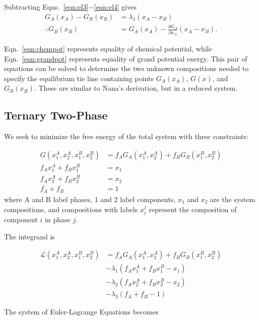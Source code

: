 \documentclass[10pt]{article}
\begin{document}
Subtracting Eqns.~\ref{eqn:el3}$-$\ref{eqn:el4} gives
\begin{align}
  G_A(x_A) - G_B(x_B) &= \lambda_1(x_A - x_B)\\
  \label{eqn:grandpot}
  \therefore G_B(x_B) &= G_A(x_A) - \frac{\partial G_A}{\partial x_A}\left(x_A - x_B\right).
\end{align}

Eqn.~\ref{eqn:chempot} represents equality of chemical potential, while
Eqn.~\ref{eqn:grandpot} represents equality of grand potential energy. This pair
of equations can be solved to determine the two unknown compositions needed to
specify the equilibrium tie line containing points $G_A(x_A)$, $G(x)$, and
$G_B(x_B)$. These are similar to Nana's derivation, but in a reduced system.

\subsection*{Ternary Two-Phase}

We seek to minimize the free energy of the total system with three constraints:

\begin{align}
  G(x_1^A, x_2^A, x_1^B, x_2^B) &= f_A G_A(x_1^A,x_2^A) + f_B G_B(x_1^B, x_2^B)\\
  f_A x_1^A + f_B x_1^B &= x_1\\
  f_A x_2^A + f_B x_2^B &= x_2\\
  f_A + f_B &= 1
\end{align}
where A and B label phases, 1 and 2 label components, $x_1$ and $x_2$ are the system compositions,
and compositions with labels $x_i^j$ represent the composition of component $i$ in phase $j$.

The integrand is

\begin{align}
  \nonumber
  \mathcal{L}(x_1^A, x_2^A, x_1^B, x_2^B) &= f_A G_A(x_1^A, x_2^A) + f_B G_B(x_1^B, x_2^B)\\
  \nonumber
                                          &- \lambda_1(f_A x_1^A + f_B x_1^B - x_1)\\
  \nonumber
                                          &- \lambda_2(f_A x_2^A + f_B x_2^B - x_2)\\
                                          &- \lambda_3(f_A + f_B - 1)
\end{align}

The system of Euler-Lagrange Equations becomes
\end{document}

